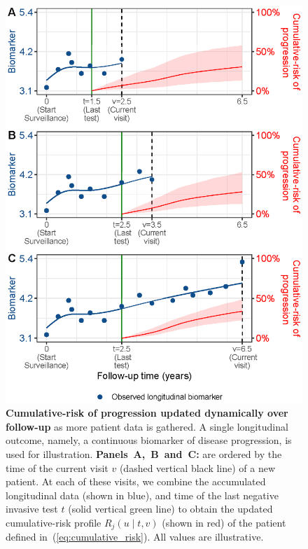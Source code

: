 \documentclass[useAMS, usenatbib, referee]{biom}
\begin{document}
\begin{figure}
\centerline{\includegraphics{dynrisk_plot_102.eps}}
\caption{\textbf{Cumulative-risk of progression updated dynamically over follow-up} as more patient data is gathered. A single longitudinal outcome, namely, a continuous biomarker of disease progression, is used for illustration. \textbf{Panels~A,~B~and~C:} are ordered by the time of the current visit $v$ (dashed vertical black line) of a new patient. At each of these visits, we combine the accumulated longitudinal data (shown in blue), and time of the last negative invasive test $t$ (solid vertical green line) to obtain the updated cumulative-risk profile $R_j(u \mid t, v)$ (shown in red) of the patient defined in~(\ref{eq:cumulative_risk}). All values are illustrative.}\label{fig:dynrisk_explanation}
\end{figure}
\end{document}

